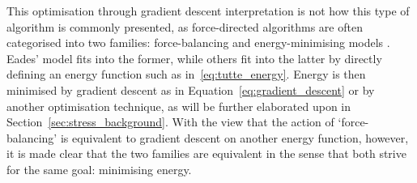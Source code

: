 This optimisation through gradient descent interpretation is not how this type of algorithm is commonly presented, as  force-directed algorithms are often categorised into two families: force-balancing and energy-minimising models \citep{Ortmann2017, Brandes2001Physical}.
Eades' model fits into the former, while others fit into the latter by directly defining an energy function such as in~\eqref{eq:tutte_energy}.
Energy is then minimised by gradient descent as in Equation~\eqref{eq:gradient_descent} or by another optimisation technique, as will be further elaborated upon in Section~\ref{sec:stress_background}.
With the view that the action of `force-balancing' is equivalent to gradient descent on another energy function, however, it is made clear that the two families are equivalent in the sense that both strive for the same goal: minimising energy.


